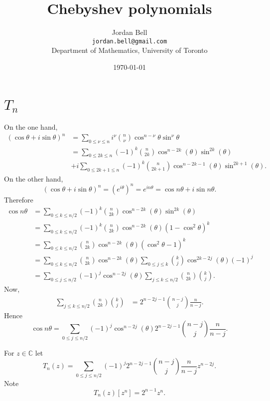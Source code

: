 \documentclass{article}
\theoremstyle{definition}
\begin{document}
\title{Chebyshev polynomials}
\author{Jordan Bell\\ \texttt{jordan.bell@gmail.com}\\Department of Mathematics, University of Toronto}
\date{\today}

\maketitle

\section{$T_n$}
On the one hand, 
\begin{align*}
(\cos \theta + i \sin \theta)^n&=\sum_{0 \leq \nu \leq n} i^\nu \binom{n}{\nu} \cos^{n-\nu} \theta \sin^\nu \theta\\
&=\sum_{0 \leq 2k \leq n} (-1)^k \binom{n}{2k}\cos^{n-2k}(\theta) \sin^{2k}(\theta)\\
&+i\sum_{0 \leq 2k+1 \leq n}  (-1)^k \binom{n}{2k+1}\cos^{n-2k-1}(\theta) \sin^{2k+1}(\theta).
\end{align*}
On the other hand,
\[
(\cos \theta+i\sin \theta)^n = (e^{i\theta})^n = e^{in\theta} = \cos n\theta + i\sin n\theta.
\]
Therefore
\begin{align*}
\cos n\theta&=\sum_{0 \leq k \leq n/2} (-1)^k \binom{n}{2k}\cos^{n-2k}(\theta) \sin^{2k}(\theta)\\
&=\sum_{0 \leq k \leq n/2} (-1)^k \binom{n}{2k}\cos^{n-2k}(\theta) (1-\cos^2 \theta)^k\\
&=\sum_{0 \leq k \leq n/2} \binom{n}{2k}\cos^{n-2k}(\theta) (\cos^2 \theta-1)^k\\
&=\sum_{0 \leq k \leq n/2} \binom{n}{2k}\cos^{n-2k}(\theta) \sum_{0 \leq j \leq k} \binom{k}{j} \cos^{2k-2j}(\theta)  (-1)^j\\
&=\sum_{0 \leq j \leq n/2} (-1)^j \cos^{n-2j}(\theta) \sum_{j \leq k \leq n/2} \binom{n}{2k} \binom{k}{j}.
\end{align*}
Now,
\begin{align*}
\sum_{j \leq k \leq n/2} \binom{n}{2k} \binom{k}{j}&=
2^{n-2j-1} \binom{n-j}{j} \frac{n}{n-j}.
\end{align*}
Hence
\[
\cos n\theta = \sum_{0 \leq j \leq n/2} (-1)^j \cos^{n-2j}(\theta)2^{n-2j-1} \binom{n-j}{j} \frac{n}{n-j}.
\]

For $z \in \mathbb{C}$ let 
\begin{equation}
T_n(z) =  \sum_{0 \leq j \leq n/2} (-1)^j 2^{n-2j-1} \binom{n-j}{j} \frac{n}{n-j} z^{n-2j}.
\label{Tn}
\end{equation}
Note
\[
T_n(z)[z^n] = 2^{n-1} z^n.
\]
\end{document}
